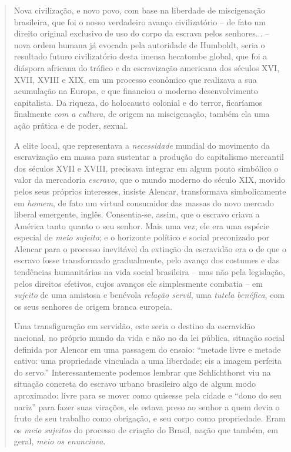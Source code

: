 \begin{quote}
Nova civilização, e novo povo, com base na liberdade de miscigenação
brasileira, que foi o nosso verdadeiro avanço civilizatório -- de fato
um direito original exclusivo de uso do corpo da escrava pelos
senhores... -- nova ordem humana já evocada pela autoridade de Humboldt,
seria o resultado futuro civilizatório desta imensa hecatombe global,
que foi a diáspora africana do tráfico e da escravização americana dos
séculos XVI, XVII, XVIII e XIX, em um processo econômico que realizava a
sua acumulação na Europa, e que financiou o moderno desenvolvimento
capitalista. Da riqueza, do holocausto colonial e do terror, ficaríamos
finalmente \emph{com a cultura}, de origem na miscigenação, também ela
uma ação prática e de poder, sexual.

A elite local, que representava a \emph{necessidade} mundial do
movimento da escravização em massa para sustentar a produção do
capitalismo mercantil dos séculos XVII e XVIII, precisava integrar em
algum ponto simbólico o valor da mercadoria \emph{escravo}, que o mundo
moderno do século XIX, movido pelos seus próprios interesses, insiste
Alencar, transformava simbolicamente em \emph{homem}, de fato um virtual
consumidor das massas do novo mercado liberal emergente, inglês.
Consentia-se, assim, que o escravo criava a América tanto quanto o seu
senhor. Mais uma vez, ele era uma espécie especial de \emph{meio
sujeito}; e o horizonte político e social preconizado por Alencar para o
processo inevitável da extinção da escravidão era o de que o escravo
fosse transformado gradualmente, pelo avanço dos costumes e das
tendências humanitárias na vida social brasileira -- mas não pela
legislação, pelos direitos efetivos, cujos avanços ele simplesmente
combatia -- em \emph{sujeito} de uma amistosa e benévola \emph{relação
servil}, uma \emph{tutela benéfica}, com os seus senhores de origem
branca europeia.

Uma transfiguração em servidão, este seria o destino da escravidão
nacional, no próprio mundo da vida e não no da lei pública, situação
social definida por Alencar em uma passagem do ensaio: ``metade livre e
metade cativo: uma propriedade vinculada a uma liberdade; eis a imagem
perfeita do servo.'' Interessantemente podemos lembrar que Schlichthorst
viu na situação concreta do escravo urbano brasileiro algo de algum modo
aproximado: livre para se mover como quisesse pela cidade e ``dono do
seu nariz'' para fazer suas virações, ele estava preso ao senhor a quem
devia o fruto de seu trabalho como obrigação, e seu corpo como
propriedade. Eram os \emph{meio sujeitos} do processo de criação do
Brasil, nação que também, em geral, \emph{meio os enunciava}.


\end{quote}
